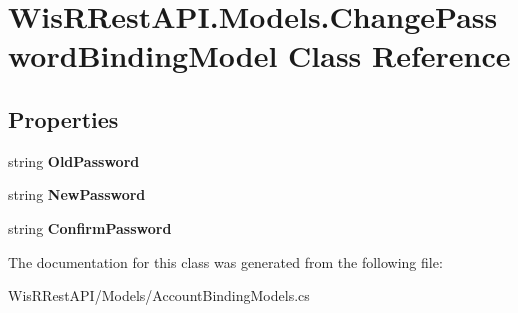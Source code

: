 \hypertarget{class_wis_r_rest_a_p_i_1_1_models_1_1_change_password_binding_model}{}\section{Wis\+R\+Rest\+A\+P\+I.\+Models.\+Change\+Password\+Binding\+Model Class Reference}
\label{class_wis_r_rest_a_p_i_1_1_models_1_1_change_password_binding_model}
\subsection*{Properties}
\begin{DoxyCompactItemize}
\item 
\hypertarget{class_wis_r_rest_a_p_i_1_1_models_1_1_change_password_binding_model_a804199c030d1c858280a6661cf83a1c0}{}string {\bfseries Old\+Password}\label{class_wis_r_rest_a_p_i_1_1_models_1_1_change_password_binding_model_a804199c030d1c858280a6661cf83a1c0}

\item 
\hypertarget{class_wis_r_rest_a_p_i_1_1_models_1_1_change_password_binding_model_a0e4dc4a322fbd362cf38f44a3670bc16}{}string {\bfseries New\+Password}\label{class_wis_r_rest_a_p_i_1_1_models_1_1_change_password_binding_model_a0e4dc4a322fbd362cf38f44a3670bc16}

\item 
\hypertarget{class_wis_r_rest_a_p_i_1_1_models_1_1_change_password_binding_model_a570a5800c2dde69a5a730c18e829a554}{}string {\bfseries Confirm\+Password}\label{class_wis_r_rest_a_p_i_1_1_models_1_1_change_password_binding_model_a570a5800c2dde69a5a730c18e829a554}

\end{DoxyCompactItemize}


The documentation for this class was generated from the following file\+:\begin{DoxyCompactItemize}
\item 
Wis\+R\+Rest\+A\+P\+I/\+Models/Account\+Binding\+Models.\+cs\end{DoxyCompactItemize}

